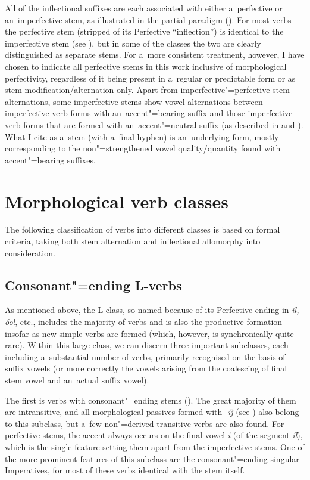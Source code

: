 All of the inflectional suffixes are each associated with either a~perfective or an~imperfective
stem, as illustrated in the partial paradigm (). For most verbs the perfective stem
(stripped of its Perfective ``inflection'') is identical to the imperfective stem (see ), but
in some of the classes the two are clearly distinguished as separate stems. For a~more consistent
treatment, however, I have chosen to indicate all perfective stems in this work inclusive of
morphological perfectivity, regardless of it being present in a~regular or predictable form or as
stem modification/alternation only. Apart from imperfective"=perfective stem alternations, some
imperfective stems show vowel alternations between imperfective verb forms with an~accent"=bearing
suffix and those imperfective verb forms that are formed with an~accent"=neutral suffix (as described
in  and ). What I cite as a~stem (with a~final hyphen) is an~underlying form, mostly
corresponding to the non"=strengthened vowel quality/quantity found with accent"=bearing suffixes.


\section{Morphological verb classes}
\label{sec:8-3}


The following classification of verbs into different classes is based on formal criteria, taking both stem alternation and inflectional allomorphy into consideration.


\subsection{Consonant"=ending L-verbs}
\label{subsec:8-3-1}


As mentioned above, the L-class, so named because of its Perfective ending in \textit{íl, óol}, etc., includes the majority of verbs and is also the productive formation insofar as new simple verbs are formed (which, however, is synchronically quite rare). Within this large class, we can discern three important subclasses, each including a~substantial number of verbs, primarily recognised on the basis of suffix vowels (or more correctly the vowels arising from the coalescing of final stem vowel and an~actual suffix vowel).


The first is verbs with consonant"=ending stems (). The great majority of them are intransitive, and all morphological passives formed with \textit{-íǰ} (see ) also belong to this subclass, but a~few non"=derived transitive verbs are also found. For perfective stems, the accent always occurs on the final vowel \textit{í} (of the segment \textit{íl}), which is the single feature setting them apart from the imperfective stems. One of the more prominent features of this subclass are the consonant"=ending singular Imperatives, for most of these verbs identical with the stem itself.


